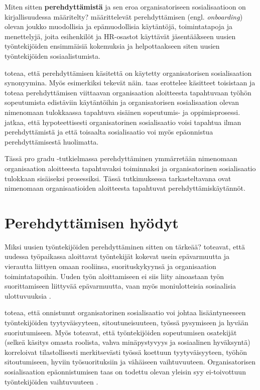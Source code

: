 \documentclass[utf8]{gradu3}
\begin{document}
Miten sitten \textbf{perehdyttämistä} ja sen eroa organisatoriseen sosialisaatioon on kirjallisuudessa määritelty? \textcite{klein-polin-2012} määrittelevät perehdyttämisen (engl. \textit{onboarding}) olevan joukko muodollisia ja epämuodollisia käytäntöjä, toimintatapoja ja menettelyjä, joita esihenkilöt ja HR-osastot käyttävät jäsentääkseen uusien työntekijöiden ensimmäisiä kokemuksia ja helpottaakseen siten uusien työntekijöiden sosiaalistumista.

\textcite{chao-2012} toteaa, että perehdyttämisen käsitettä on käytetty organisatorisen sosialisaation synonyymina. Myös esimerkiksi \textcite{bauer-ym-2007} tekevät näin. \textcite{wanberg-2012} taas erottelee käsitteet toisistaan ja toteaa perehdyttämisen viittaavan organisaation aloitteesta tapahtuvaan työhön sopeutumista edistäviin käytäntöihin ja organisatorisen sosialisaation olevan nimenomaan tulokkaassa tapahtuva sisäinen sopeutumis- ja oppimisprosessi. \textcite{wanberg-2012} jatkaa, että hypoteettisesti organisatorinen sosialisaatio voisi tapahtua ilman perehdyttämistä ja että toisaalta sosialisaatio voi myös epäonnistua perehdyttämisestä huolimatta.

Tässä pro gradu -tutkielmassa perehdyttäminen ymmärretään nimenomaan organisaation aloitteesta tapahtuvaksi toiminnaksi ja organisatorinen sosialisaatio tulokkaan sisäiseksi prosessiksi. Tässä tutkimuksessa tarkasteltavana ovat nimenomaan organisaatioiden aloitteesta tapahtuvat perehdyttämiskäytännöt.


\section{Perehdyttämisen hyödyt}
\label{luku-perehdyttämisen-hyödyt}

Miksi uusien työntekijöiden perehdyttäminen sitten on tärkeää? \textcite{saks-gruman-2012} toteavat, että uudessa työpaikassa aloittavat työntekijät kokevat usein epävarmuutta ja vierautta liittyen omaan rooliinsa, suorituskykyynsä ja organisaation toimintatapoihin. Uuden työn aloittamiseen ei siis liity ainoastaan työn  suorittamiseen liittyvää epävarmuutta, vaan myös moniulotteisia sosiaalisia ulottuvuuksia \parencite{saks-gruman-2012}. 

\textcite{wanberg-2012} toteaa, että onnistunut organisatorinen sosialisaatio voi johtaa lisääntyneeseen työntekijöiden tyytyväisyyteen, sitoutuneisuuteen, työssä pysymiseen ja hyvään suoriutumiseen. Myös \textcite{bauer-ym-2007} toteavat, että työntekijöiden sopeutumisen osatekijät (selkeä käsitys omasta roolista, vahva minäpystyvyys ja sosiaalinen hyväksyntä) korreloivat tilastollisesti merkitsevästi työssä koettuun tyytyväisyyteen, työhön sitoutumiseen, hyviin työsuorituksiin ja vähäiseen vaihtuvuuteen. Organisatorisen sosialisaation epäonnistumisen taas on todettu olevan yleisin syy ei-toivottuun työntekijöiden vaihtuvuuteen \parencite{bauer-ym-1998}.
\end{document}
